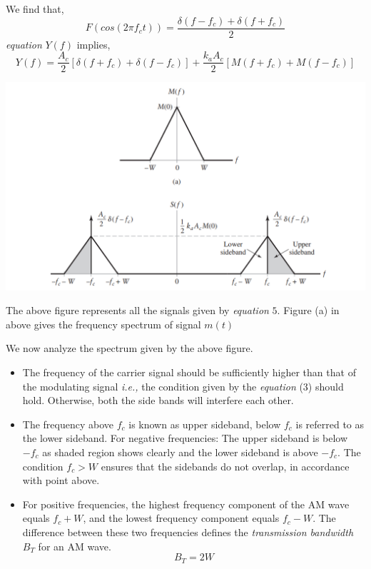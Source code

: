 \documentclass[12pt,a4paper]{article}%
\begin{document}
\begin{flushleft}
\begin{center}
		\end{center}
		We find that,
		\begin{equation}
			F(cos(2 \pi f_c t))=\dfrac{\delta(f-f_c)+\delta(f+f_c)}{2}
		\end{equation}
		\textit{equation} $Y(f)$ implies,
		\begin{equation}
		Y(f)=\dfrac{A_c}{2}[\delta(f+f_c)+\delta(f-f_c)]+\dfrac{k_a A_c}{2}[M(f+f_c)+M(f-f_c)]
		\end{equation}
		\begin{center}
			\includegraphics[width=0.99 \textwidth]{./images/AM modulation_1.png}
		\end{center}
		\begin{center}
			The above figure represents all the signals given by \textit{equation} $5$. Figure (a) in above gives the frequency spectrum of signal $m(t)$
		\end{center}
		\pagebreak
		\begin{flushleft}
			We now analyze the spectrum given by the above figure.
			\begin{itemize}
				\item{The frequency of the carrier signal should be sufficiently higher than that of the modulating signal \textit{i.e.,} the condition given by the \textit{equation} (3) should hold. Otherwise, both the side bands will interfere each other.}
				\item{The frequency above $f_c$ is known as upper sideband, below $f_c$ is referred to as the lower sideband. For negative frequencies: The upper sideband is below $-f_c$ as shaded region shows clearly and the lower sideband is above $-f_c$. The condition $f_c>W$ ensures that the sidebands do not overlap, in accordance with point above.}
				\item{For positive frequencies, the highest frequency component of the AM wave equals $f_c + W$, and the lowest frequency component equals $f_c-W$. The difference between these two frequencies defines the \textit{transmission bandwidth} $B_T$ for an AM wave.}
				\begin{equation}
					B_T = 2W
				\end{equation}
			\end{itemize}
		\end{flushleft}
	

\end{flushleft}
\end{document}
